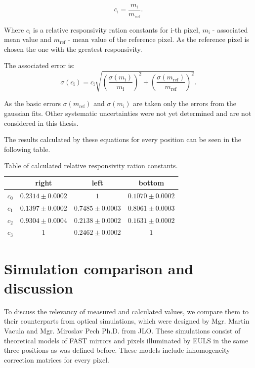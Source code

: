 \begin{equation}
c_{\textrm{i}} = \frac{m_{\textrm{i}}}{m_{\textrm{ref}}}.
\end{equation}

Where $c_{\textrm{i}}$ is a relative responsivity ration constants for i-th pixel, $m_{\textrm{i}}$ - associated mean value and $m_{\textrm{ref}}$ - mean value of the reference pixel. As the reference pixel is chosen the one with the greatest responsivity. 
\par
The associated error is:
\begin{equation}
\sigma(c_{\textrm{i}}) = c_{\textrm{i}} \sqrt{(\frac{\sigma(m_{\textrm{i}})}{m_{\textrm{i}}})^2 + (\frac{\sigma(m_{\textrm{ref}})}{m_{\textrm{ref}}})^2}.
\end{equation}

As the basic errors $\sigma(m_{\textrm{ref}})$ and $\sigma(m_{\textrm{i}})$ are taken only the errors from the gaussian fits. Other systematic uncertainties were not yet determined and are not considered in this thesis.
\par
The results calculated by these equations for every position can be seen in the following table.

\begin{table}[H]
\centering
\begin{tabular}{|c|c|c|c|}
\hline
   & right & left & bottom \\ \hline
$c_0$ & $0.2314 \pm 0.0002$    & $1$   				   & $0.1070 \pm 0.0002$     \\ \hline
$c_1$ & $0.1397 \pm 0.0002$    & $0.7485 \pm 0.0003$   & $0.8061 \pm 0.0003$      \\ \hline
$c_2$ & $0.9304 \pm 0.0004$    & $0.2138 \pm 0.0002$   & $0.1631 \pm 0.0002$      \\ \hline
$c_3$ & $1$    				   & $0.2462 \pm 0.0002$   & $1$      \\ \hline
\end{tabular}
\caption{Table of calculated relative responsivity ration constants.}
 \label{CalibConstTbl}
\end{table}



\section{Simulation comparison and discussion}

To discuss the relevancy of measured and calculated values, we compare them to their counterparts from optical simulations, which were designed by Mgr. Martin Vacula and Mgr. Miroslav Pech Ph.D. from JLO. These simulations consist of theoretical models of FAST mirrors and pixels illuminated by EULS in the same three positions as was defined before. These models include inhomogeneity correction matrices for every pixel.

